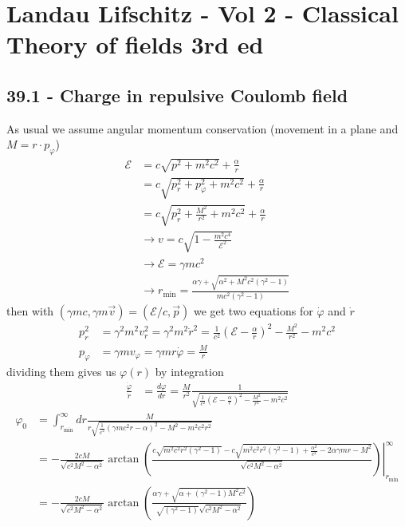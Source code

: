 \documentclass[../main.tex]{subfiles}
\begin{document}
\section{{\sc Landau Lifschitz} - Vol 2 - Classical Theory of fields 3rd ed}
\subsection{39.1 - Charge in repulsive Coulomb field}
As usual we assume angular momentum conservation (movement in a plane and $M=r\cdot p_\varphi$) 
\begin{align}
\mathcal{E}
&=c\sqrt{p^2+m^2c^2}+\frac{\alpha}{r}\\
&=c\sqrt{p_r^2+p_\varphi^2+m^2c^2}+\frac{\alpha}{r}\\
&=c\sqrt{p_r^2+\frac{M^2}{r^2}+m^2c^2}+\frac{\alpha}{r}\\
&\rightarrow v=c\sqrt{1-\frac{m^2c^4}{\mathcal{E}^2}}\\
&\rightarrow \mathcal{E}=\gamma mc^2\\
&\rightarrow r_\text{min}=\frac{\alpha\gamma+\sqrt{\alpha^2+M^2c^2(\gamma^2-1)}}{mc^2(\gamma^2-1)}
\end{align}
then with $(\gamma mc,\gamma m\vec{v})=(\mathcal{E}/c,\vec{p})$ we get two equations for $\dot\varphi$ and $\dot r$
\begin{align}
p_r^2&=\gamma^2m^2v_r^2=\gamma^2m^2\dot{r}^2=\frac{1}{c^2}\left(\mathcal{E}-\frac{\alpha}{r}\right)^2-\frac{M^2}{r^2}-m^2c^2\\
p_\varphi&=\gamma m v_\varphi=\gamma m r\dot{\varphi}=\frac{M}{r}
\end{align}
dividing them gives us $\varphi(r)$ by integration
\begin{align}
\frac{\dot\varphi}{\dot{r}}
&=\frac{d\varphi}{dr}
=\frac{M}{r^2}\frac{1}{\sqrt{\frac{1}{c^2}\left(\mathcal{E}-\frac{\alpha}{r}\right)^2-\frac{M^2}{r^2}-m^2c^2}}
\end{align}
\begin{align}
\varphi_0
&=\int^\infty_{r_\text{min}} dr\frac{M}{r\sqrt{\frac{1}{c^2}\left(\gamma m c^2r-\alpha\right)^2-M^2-m^2c^2r^2}}\\
&=\left.-\frac{2 c M}{\sqrt{c^2 M^2-\alpha ^2}} \arctan\left(\frac{c\sqrt{m^2c^2r^2 \left(\gamma ^2-1\right)}-c
   \sqrt{m^2c^2r^2 \left(\gamma ^2-1\right) +\frac{\alpha ^2}{c^2}-2 \alpha  \gamma  mr-M^2}}{\sqrt{c^2 M^2-\alpha ^2}}\right)\right|_{r_\text{min}}^\infty\\
&=-\frac{2 c M}{\sqrt{c^2 M^2-\alpha ^2}} \arctan\left(\frac{\alpha  \gamma + \sqrt{\alpha
+\left(\gamma ^2-1\right) M^2c^2}}{\sqrt{ \left(\gamma ^2-1\right)} \sqrt{c^2 M^2-\alpha ^2}}\right)
\end{align}
\end{document}

